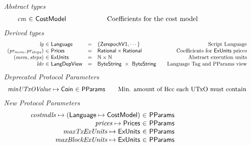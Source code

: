 \begin{figure*}[htb]
  \emph{Abstract types}
  \begin{equation*}
    \begin{array}{r@{~\in~}l@{\qquad\qquad\qquad}r}
      \var{cm} & \CostMod & \text{Coefficients for the cost model}
    \end{array}
  \end{equation*}
  \emph{Derived types}
  \begin{equation*}
    \begin{array}{r@{~\in~}l@{\quad=\quad}l@{\qquad}r}
      \var{lg}
      & \Language
      & \{\ZerepochVI, \dotsb\}
      & \text{Script Language}
      \\
      \var{(pr_{mem}, pr_{steps})}
      & \Prices
      & \mathsf{Rational} \times \mathsf{Rational}
      & \text {Coefficients for $\ExUnits$ prices}
      \\
      \var{(mem, steps)}
      & \ExUnits
      & \N \times \N
      & \text{Abstract execution units}
      \\
      \var{ldv}
      & \LangDepView
      & \ByteString~\times~\ByteString
      & \text{Language Tag and PParams view}
    \end{array}
  \end{equation*}
  \emph{Deprecated Protocol Parameters}
  \begin{equation*}
      \begin{array}{r@{~\in~}l@{\qquad}r}
        \var{minUTxOValue} \mapsto \Coin & \PParams & \text{Min. amount of Bcc each UTxO must contain}
      \end{array}
  \end{equation*}
  \emph{New Protocol Parameters}
  \begin{equation*}
      \begin{array}{r@{~\in~}l@{\qquad}r}
        \var{costmdls} \mapsto (\Language \mapsto \CostMod) & \PParams \\
        \var{prices} \mapsto \Prices & \PParams \\
        \var{maxTxExUnits} \mapsto \ExUnits & \PParams \\
        \var{maxBlockExUnits} \mapsto \ExUnits & \PParams \\

\end{array}
\end{equation*}
\end{figure*}
